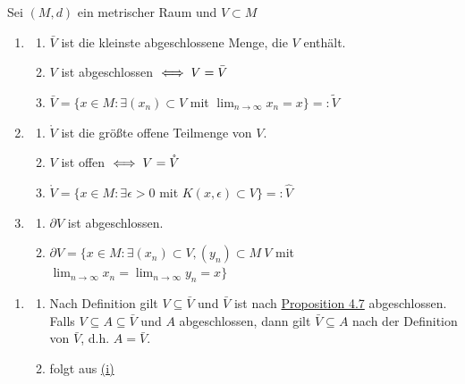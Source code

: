 \begin{prop} \label{prop:1-4.8}
	Sei $(M, d)$ ein metrischer Raum und $V \subset M$
	\begin{enumerate}[label=\alph*\upshape)]
		\item
			\begin{enumerate}
				\item \label{prop:1-4.8.a1} $\bar V$ ist die kleinste abgeschlossene Menge, die $V$ enthält.
				\item \label{prop:1-4.8.a2} $V$ ist abgeschlossen $\iff V = \bar V$
				\item \label{prop:1-4.8.a3} $\bar V = \{ x \in M: \exists (x_{n}) \subset V$ mit $\lim_{n \rightarrow \infty} x_{n} = x \} =: \tilde V$
			\end{enumerate} 
		\item 
			\begin{enumerate}
				\item \label{prop:1-4.8.b1} $\mathring V$ ist die grö{\ss}te offene Teilmenge von $V$.
				\item \label{prop:1-4.8.b2} $V$ ist offen $\iff V = \mathring V$
				\item \label{prop:1-4.8.b3} $\mathring V = \{ x \in M: \exists \epsilon > 0$ mit $K(x, \epsilon) \subset V \} =: \hat V$
			\end{enumerate} 
		\item
			\begin{enumerate}
				\item \label{prop:1-4.8.c1} $\partial V$ ist abgeschlossen.
				\item \label{prop:1-4.8.c2} $\partial V = \{ x \in M: \exists (x_{n}) \subset V, (y_{n}) \subset M \ V$ mit $ \lim_{n \rightarrow \infty} x_{n} = \lim_{n \rightarrow \infty} y_{n} = x \}$
			\end{enumerate} 
	\end{enumerate}	
	\begin{beweis}
		\begin{enumerate}[label=\alph*\upshape)]
			\item
				\begin{enumerate}
					\item \label{prop:1-4.8.a1-proof} Nach Definition gilt $V \subseteq \bar V$ und $\bar V$ ist nach \hyperref[prop:1-4.8]{Proposition 4.7} abgeschlossen. \\
						Falls $V \subseteq A \subseteq \bar V$ und $A$ abgeschlossen, dann gilt $\bar V \subseteq A$ nach der Definition von $\bar V$, d.h. $A = \bar V$.
					\item folgt aus \hyperref[prop:1-4.8.a1]{(i)}

\end{enumerate}
\end{enumerate}
\end{beweis}
\end{prop}
